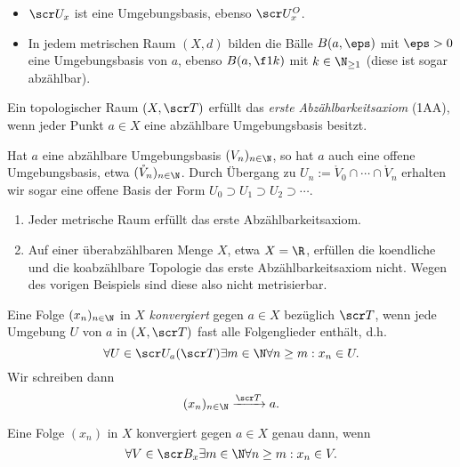 \begin{ex}
	\begin{itemize}
		\item
			$\scr U_x$ ist eine Umgebungsbasis, ebenso $\scr U_x^O$.
		\item
			In jedem metrischen Raum $(X,d)$ bilden die Bälle $B(a,\eps)$ mit $\eps > 0$ eine Umgebungsbasis von $a$, ebenso $B(a, \f 1k)$ mit $k \in \N_{\ge 1}$ (diese ist sogar abzählbar).
	\end{itemize}
\end{ex}

\begin{df} \label{df:first_axiom_of_countability}
	Ein topologischer Raum $(X, \scr T)$ erfüllt das \emph{erste Abzählbarkeitsaxiom} (1AA), wenn jeder Punkt $a \in X$ eine abzählbare Umgebungsbasis besitzt.
	\begin{note}
		Hat $a$ eine abzählbare Umgebungsbasis $(V_n)_{n\in\N}$, so hat $a$ auch eine offene Umgebungsbasis, etwa $(\mathring V_n)_{n\in\N}$.
		Durch Übergang zu $U_n := \mathring V_0 \cap \dotsb \cap \mathring V_n$ erhalten wir sogar eine offene Basis der Form $U_0 \supset U_1 \supset U_2 \supset \dotsb$.
	\end{note}
\end{df}

\begin{ex}
	\begin{enumerate}[1.]
		\item
			Jeder metrische Raum erfüllt das erste Abzählbarkeitsaxiom.
		\item
			Auf einer überabzählbaren Menge $X$, etwa $X = \R$, erfüllen die koendliche und die koabzählbare Topologie das erste Abzählbarkeitsaxiom nicht.
			Wegen des vorigen Beispiels sind diese also nicht metrisierbar.
	\end{enumerate}
\end{ex}

\begin{df}[Konvergenz]
	Eine Folge $(x_n)_{n\in \N}$ in $X$ \emph{konvergiert} gegen $a \in X$ bezüglich $\scr T$, wenn jede Umgebung $U$ von $a$ in $(X, \scr T)$ fast alle Folgenglieder enthält, d.h.
	\[
		\forall U \in \scr U_a(\scr T) \exists m \in \N \forall n \ge m : x_n \in U.
	\]
	Wir schreiben dann
	\[
		(x_n)_{n\in \N} \xrightarrow{\scr T} a.
	\]
\end{df}

\begin{prop}
	Eine Folge $(x_n)$ in $X$ konvergiert gegen $a \in X$ genau dann, wenn
	\[
		\forall V \in \scr B_x \exists m \in \N \forall n \ge m : x_n \in V.
	\]
\end{prop}

